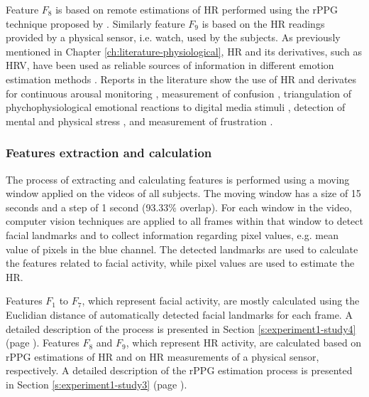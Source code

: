 Feature $F_8$ is based on remote estimations of HR performed using the rPPG technique proposed by \textcite{poh2011advancements}. Similarly feature $F_9$ is based on the HR readings provided by a physical sensor, i.e. watch, used by the subjects. As previously mentioned in Chapter \ref{ch:literature-physiological}, HR and its derivatives, such as HRV, have been used as reliable sources of information in different emotion estimation methods \parencite{kukolja2014comparative}. Reports in the literature show the use of HR and derivates for continuous arousal monitoring \parencite{grundlehner2009design}, measurement of confusion \parencite{xiao2015towards}, triangulation of phychophysiological emotional reactions to digital media stimuli \parencite{nogueira2015annotation}, detection of mental and physical stress \parencite{vandeput2009heart,garde2002effects}, and measurement of frustration \parencite{rodriguez2015vr}.

\subsubsection{Features extraction and calculation}

The process of extracting and calculating features is performed using a moving window applied on the videos of all subjects. The moving window has a size of 15 seconds and a step of 1 second (93.33\% overlap). For each window in the video, computer vision techniques are applied to all frames within that window to detect facial landmarks and to collect information regarding pixel values, e.g. mean value of pixels in the blue channel. The detected landmarks are used to calculate the features related to facial activity, while pixel values are used to estimate the HR.

Features $F_1$ to $F_7$, which represent facial activity, are mostly calculated using the Euclidian distance of automatically detected facial landmarks for each frame. A detailed description of the process is presented in Section \ref{s:experiment1-study4} (page \pageref{s:experiment1-study4}). Features $F_8$ and $F_9$, which represent HR activity, are calculated based on rPPG estimations of HR and on HR measurements of a physical sensor, respectively. A detailed description of the rPPG estimation process is presented in Section \ref{s:experiment1-study3} (page \pageref{s:experiment1-study3}).

